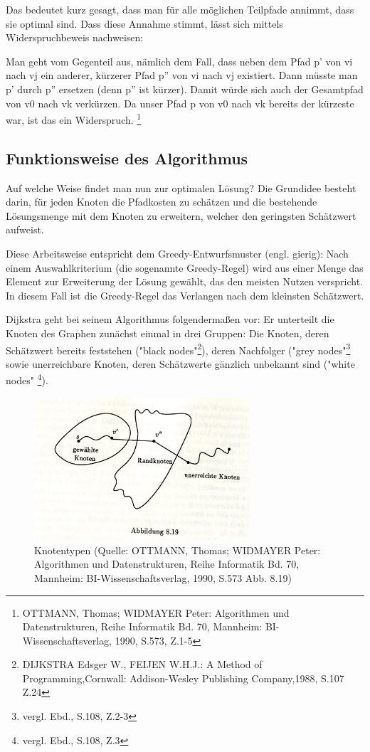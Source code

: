 \parindent0pt Das bedeutet kurz gesagt, dass man für alle möglichen Teilpfade annimmt, dass sie optimal sind.
Dass diese Annahme stimmt, lässt sich mittels Widerspruchbeweis nachweisen: 

\parindent0pt Man geht vom Gegenteil aus, nämlich dem Fall, dass neben dem Pfad p' von v{\tiny i} nach v{\tiny j} ein anderer, kürzerer Pfad p'' von v{\tiny i }nach v{\tiny j} existiert. Dann müsste man p' durch p'' ersetzen (denn p'' ist kürzer). Damit würde sich auch der Gesamtpfad von v{\tiny 0} nach v{\tiny k} verkürzen. Da unser Pfad p von v{\tiny 0} nach v{\tiny k} bereits der kürzeste war, ist das  ein Widerspruch. \footnote{OTTMANN, Thomas; WIDMAYER Peter: Algorithmen und Datenstrukturen, Reihe Informatik Bd. 70, Mannheim: BI-Wissenschaftsverlag, 1990, S.573, Z.1-5}


\subsection{Funktionsweise des Algorithmus}
Auf welche Weise findet man nun zur optimalen Lösung?
Die Grundidee besteht darin, für jeden Knoten die Pfadkosten zu schätzen und die bestehende Lösungsmenge mit dem Knoten zu erweitern, welcher den geringsten Schätzwert aufweist. 

\parindent0pt Diese Arbeitsweise entspricht dem Greedy-Entwurfsmuster (engl. gierig): Nach einem Auswahlkriterium (die sogenannte Greedy-Regel) wird aus einer Menge das Element zur Erweiterung der Lösung gewählt, das den meisten Nutzen verspricht. In diesem Fall ist die Greedy-Regel das Verlangen nach dem kleinsten Schätzwert.

\parindent0pt Dijkstra geht bei seinem Algorithmus folgendermaßen vor: Er unterteilt die Knoten des Graphen zunächst einmal in drei Gruppen: Die Knoten, deren Schätzwert bereits feststehen ("black nodes"\footnote{DIJKSTRA Edsger W., FEIJEN W.H.J.: A Method of Programming,Cornwall: Addison-Wesley Publishing Company,1988, S.107 Z.24}), deren Nachfolger ("grey nodes"\footnote{vergl. Ebd., S.108, Z.2-3} sowie unerreichbare Knoten, deren Schätzwerte gänzlich unbekannt sind ("white nodes" \footnote{vergl. Ebd., S.108, Z.3}).

\begin{figure}[h]
\centering
\includegraphics[width = 8cm]{./chapters/knotentypen.jpg}
\caption{Knotentypen {\tiny (Quelle: OTTMANN, Thomas; WIDMAYER Peter: Algorithmen und Datenstrukturen, Reihe Informatik Bd. 70, Mannheim: BI-Wissenschaftsverlag, 1990, S.573 Abb. 8.19)} }
\label{a1}
\end{figure}


